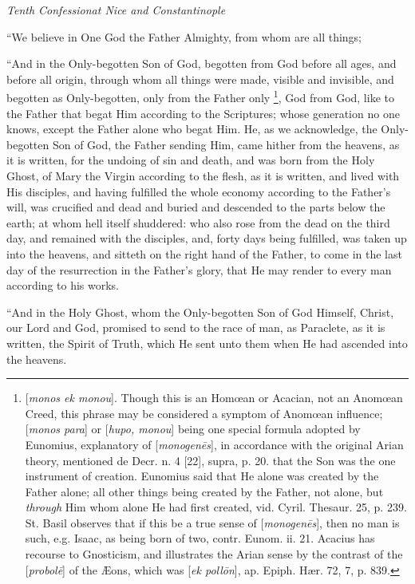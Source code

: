 \emph{Tenth
Confession}\emph{at Nice and Constantinople}

``We believe in One God the
Father Almighty, from whom are all things;

``And in the Only-begotten Son
of God, begotten from God before all ages, and before all origin,
through whom all things were made, visible and invisible, and begotten
as Only-begotten, only from the Father only \footnote{[\emph{monos ek monou}]. Though this is an Homœan or Acacian, not an
Anomœan Creed, this phrase may be considered a symptom of Anomœan
influence; [\emph{monos para}] or [\emph{hupo, monou}] being one
special formula adopted by Eunomius, explanatory of [\emph{monogen\={e}s}],
in accordance with the original Arian theory, mentioned de Decr. n. 4
[22], supra, p. 20. that the Son was the one instrument of creation.
Eunomius said that He alone was created by the Father alone; all other
things being created by the Father, not alone, but \emph{through} Him
whom alone He had first created, vid. Cyril. Thesaur. 25, p. 239. St.
Basil observes that if this be a true sense of [\emph{monogen\={e}s}],
then no man is such, e.g. Isaac, as being born of two, contr. Eunom.
ii. 21. Acacius has recourse to Gnosticism, and illustrates the Arian
sense by the contrast of the [\emph{probol\={e}}] of the Æons,
which was [\emph{ek poll\={o}n}], ap. Epiph. Hær. 72, 7, p. 839.}, God from God, like to the Father that begat Him according to
the Scriptures; whose generation no one knows, except the Father alone
who begat Him. He, as we acknowledge, the Only-begotten Son of God,
the Father sending Him, came hither from the heavens, as it is
written, for the undoing of sin and death, and was born from the Holy
Ghost, of Mary the Virgin according to the flesh, as it is written,
and lived with His disciples, and having fulfilled the whole economy
according to the Father's will, was crucified and dead and
buried and descended to the parts below the earth; at whom hell itself
shuddered: who also rose from the dead on the third day, and remained
with the disciples, and, forty days being fulfilled, was taken up into
the heavens, and sitteth on the right hand of the Father, to come in
the last day of the resurrection in the Father's glory, that He may
render to every man according to his works.

``And in the Holy Ghost, whom
the Only-begotten Son of God Himself, Christ, our Lord and God,
promised to send to the race of man, as Paraclete, as it is written,
the Spirit of Truth, which He sent unto them when He had ascended into
the heavens.

